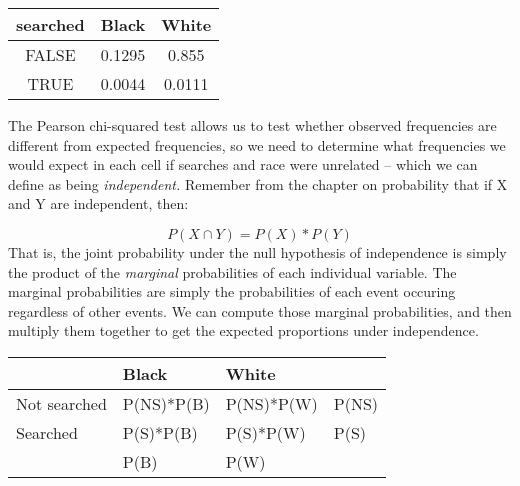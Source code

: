 \documentclass[]{book}
\theoremstyle{definition}
\theoremstyle{definition}
\theoremstyle{definition}
\theoremstyle{remark}
\begin{document}
\begin{longtable}[]{@{}ccc@{}}
\toprule
\begin{minipage}[b]{0.14\columnwidth}\centering\strut
searched\strut
\end{minipage} & \begin{minipage}[b]{0.11\columnwidth}\centering\strut
Black\strut
\end{minipage} & \begin{minipage}[b]{0.11\columnwidth}\centering\strut
White\strut
\end{minipage}\tabularnewline
\midrule
\endhead
\begin{minipage}[t]{0.14\columnwidth}\centering\strut
FALSE\strut
\end{minipage} & \begin{minipage}[t]{0.11\columnwidth}\centering\strut
0.1295\strut
\end{minipage} & \begin{minipage}[t]{0.11\columnwidth}\centering\strut
0.855\strut
\end{minipage}\tabularnewline
\begin{minipage}[t]{0.14\columnwidth}\centering\strut
TRUE\strut
\end{minipage} & \begin{minipage}[t]{0.11\columnwidth}\centering\strut
0.0044\strut
\end{minipage} & \begin{minipage}[t]{0.11\columnwidth}\centering\strut
0.0111\strut
\end{minipage}\tabularnewline
\bottomrule
\end{longtable}

The Pearson chi-squared test allows us to test whether observed
frequencies are different from expected frequencies, so we need to
determine what frequencies we would expect in each cell if searches and
race were unrelated -- which we can define as being \emph{independent.}
Remember from the chapter on probability that if X and Y are
independent, then:

\[
P(X \cap Y) = P(X) * P(Y)
\] That is, the joint probability under the null hypothesis of
independence is simply the product of the \emph{marginal} probabilities
of each individual variable. The marginal probabilities are simply the
probabilities of each event occuring regardless of other events. We can
compute those marginal probabilities, and then multiply them together to
get the expected proportions under independence.

\begin{longtable}[]{@{}llll@{}}
\toprule
& Black & White &\tabularnewline
\midrule
\endhead
Not searched & P(NS)*P(B) & P(NS)*P(W) & P(NS)\tabularnewline
Searched & P(S)*P(B) & P(S)*P(W) & P(S)\tabularnewline
& P(B) & P(W) &\tabularnewline
\bottomrule
\end{longtable}
\end{document}
